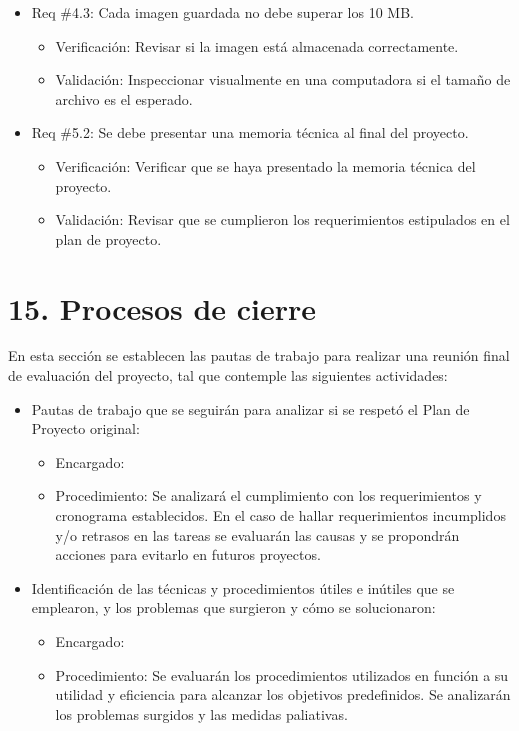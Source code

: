 \documentclass[
11pt, %
]{charter}
\begin{document}
\begin{itemize} 
\item Req \#4.3: Cada imagen guardada no debe superar los 10 MB.
\begin{itemize}
	\item Verificación: Revisar si la imagen está almacenada correctamente.
	\item Validación: Inspeccionar visualmente en una computadora si el tamaño de archivo es el esperado.
\end{itemize}
\end{itemize}

\begin{itemize} 
\item Req \#5.2: Se debe presentar una memoria técnica al final del proyecto.
\begin{itemize}
	\item Verificación: Verificar que se haya presentado la memoria técnica del proyecto.
	\item Validación: Revisar que se cumplieron los requerimientos estipulados en el plan de proyecto.
\end{itemize}
\end{itemize}


\section{15. Procesos de cierre}    
\label{sec:cierre}
En esta sección se establecen las pautas de trabajo para realizar una reunión final de evaluación del proyecto, tal que contemple las siguientes actividades:

\begin{itemize}
	\item Pautas de trabajo que se seguirán para analizar si se respetó el Plan de Proyecto original:\\
    \begin{itemize}
        \item Encargado: \authorname
        \item Procedimiento: Se analizará el cumplimiento con los requerimientos y cronograma establecidos. En el caso de hallar requerimientos incumplidos y/o retrasos en las tareas se evaluarán las causas y se propondrán acciones para evitarlo en futuros proyectos.
    \end{itemize}
\end{itemize}

\begin{itemize}
	\item Identificación de las técnicas y procedimientos útiles e inútiles que se emplearon, y los problemas que surgieron y cómo se solucionaron:\\
    \begin{itemize}
        \item Encargado: \authorname
        \item Procedimiento: Se evaluarán los procedimientos utilizados en función a su utilidad y eficiencia para alcanzar los objetivos predefinidos. Se analizarán los problemas surgidos y las medidas paliativas.
    \end{itemize}
\end{itemize}
\end{document}
